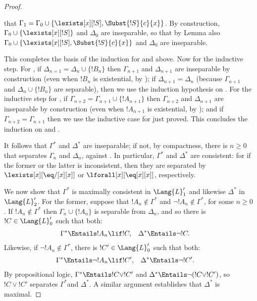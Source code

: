 \documentclass[../../include/open-logic-section]{subfiles}
\begin{document}
\begin{proof}
\begin{enumerate}
  that $\Gamma_1 = \Gamma_0 \cup \{ \lexists[x][!S], \Subst{!S}{c}{x}
  \}$. By construction, $\Gamma_0 \cup \{ \lexists[x][!S]\}$ and
  $\Delta_0$ are inseparable, so that by Lemma  also
  $\Gamma_0 \cup \{ \lexists[x][!S], \Subst{!S}{c}{x} \}$ and
  $\Delta_0$ are inseparable.
\end{enumerate}
This completes the basis of the induction for  and
 above. Now for the inductive step. For , if
$\Delta_{n=1} = \Delta_n \cup \{ !B_n \}$ then $\Gamma_{n+1}$ and
$\Delta_{n+1}$ are inseparable by construction (even when $!B_n$ is
existential, by ); if $\Delta_{n+1} = \Delta_n$
(because $\Gamma_{n+1}$ and $\Delta_n \cup \{!B_n\}$ are separable),
then we use the induction hypothesis on . For the
inductive step for , if $\Gamma_{n+2} = \Gamma_{n+1} \cup
\{!A_{n+1} \}$ then $\Gamma_{n+2}$ and $\Delta_{n+1}$ are
inseparable by construction (even when $!A_{n+1}$ is existential,
by ); and if  $\Gamma_{n+2} = \Gamma_{n+1}$ then
we use the inductive case for  just proved. This
concludes the induction on  and . 

It follows that $\Gamma^*$ and $\Delta^*$ are inseparable; if not, by
compactness, there is $n \ge 0$ that separates $\Gamma_n$ and
$\Delta_n$, against . In particular, $\Gamma^*$ and
$\Delta^*$ are consistent: for if the former or the latter is
inconsistent, then they are separated by $\lexists[x][\eq/[x][x]]$ or
  $\lforall[x][\eq[x][x]]$, respectively.

We now show that $\Gamma^*$ is maximally consistent in
$\Lang{L}'_1$ and likewise $\Delta^*$ in $\Lang{L}'_2$. For the
former, suppose that $!A_n \notin \Gamma^*$ and $\lnot !A_n
\notin \Gamma^*$, for some $n \ge 0$. If $!A_n \notin \Gamma^*$
then $\Gamma_n \cup \{!A_n \}$ is separable from $\Delta_n$, and
so there is $!C \in \Lang{L}'_0$ such that both:
\begin{align*}
  \Gamma^* & \Entails !A_n \lif !C, & 
  \Delta^* & \Entails \lnot !C.
\end{align*}
Likewise, if $\lnot !A_n \notin \Gamma^*$, there is $!C' \in
\Lang{L}'_0$ such that both:
\begin{align*}
  \Gamma^* & \Entails \lnot !A_n \lif !C', & 
  \Delta^* & \Entails \lnot !C'.
\end{align*}
By propositional logic, $\Gamma^* \Entails !C \lor !C'$ and
$\Delta^* \Entails \lnot (!C \lor !C')$, so $!C \lor
!C'$ separates $\Gamma^*$and $\Delta^*$. A similar argument
establishes that $\Delta^*$ is maximal. 


\end{proof}
\end{document}
